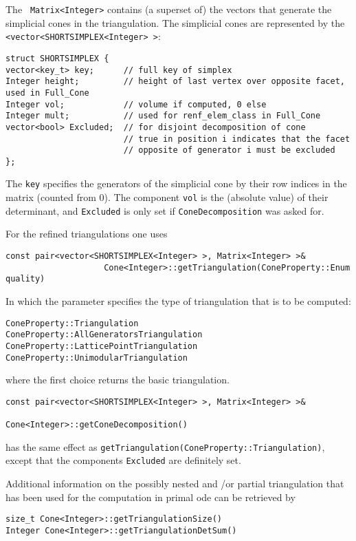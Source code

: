 \documentclass[12pt,a4paper]{scrartcl}
\theoremstyle{definition}
\begin{document}
\begin{small}
The \verb| Matrix<Integer>| contains (a superset of) the vectors that generate the simplicial cones in the triangulation. The simplicial cones are represented by the \verb|<vector<SHORTSIMPLEX<Integer> >|:
\begin{Verbatim}
struct SHORTSIMPLEX {
vector<key_t> key;      // full key of simplex
Integer height;         // height of last vertex over opposite facet, used in Full_Cone
Integer vol;            // volume if computed, 0 else
Integer mult;           // used for renf_elem_class in Full_Cone
vector<bool> Excluded;  // for disjoint decomposition of cone
                        // true in position i indicates that the facet
                        // opposite of generator i must be excluded
};
\end{Verbatim}
The \verb|key| specifies the generators of the simplicial cone by their row indices in the matrix (counted from $0$). The component \verb|vol| is the (absolute value) of their determinant, and \verb|Excluded| is only set if \verb|ConeDecomposition| was asked for.

For the refined triangulations one uses
\begin{Verbatim}
const pair<vector<SHORTSIMPLEX<Integer> >, Matrix<Integer> >& 
                    Cone<Integer>::getTriangulation(ConeProperty::Enum quality)
\end{Verbatim}
In which the parameter specifies the type of triangulation that is to be computed:
\begin{Verbatim}
ConeProperty::Triangulation
ConeProperty::AllGeneratorsTriangulation
ConeProperty::LatticePointTriangulation
ConeProperty::UnimodularTriangulation
\end{Verbatim}
where the first choice returns the basic triangulation.

\begin{Verbatim}
const pair<vector<SHORTSIMPLEX<Integer> >, Matrix<Integer> >&
                                           Cone<Integer>::getConeDecomposition()
\end{Verbatim}
has the same effect as \verb|getTriangulation(ConeProperty::Triangulation)|, except that the components \verb|Excluded| are definitely set.

Additional information on the possibly nested and /or partial triangulation that has been used for the computation in primal ode can be retrieved by
\begin{Verbatim}
size_t Cone<Integer>::getTriangulationSize()
Integer Cone<Integer>::getTriangulationDetSum() 
\end{Verbatim}


\end{small}
\end{document}
